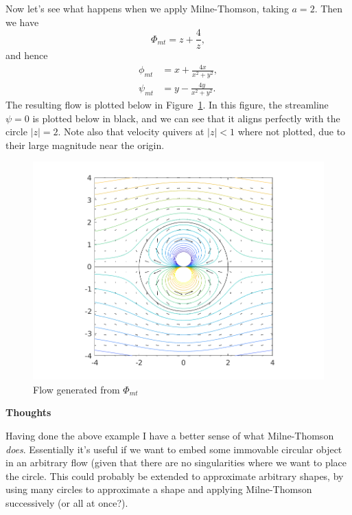 \documentclass{article}
\begin{document}
Now let's see what happens when we apply Milne-Thomson, taking $a = 2$. Then we have
%
\begin{equation*}
    \Phi_{mt} = z + \frac{4}{z}
    ,
\end{equation*}
%
and hence
%
\begin{align*}
    \phi_{mt} &= x + \frac{4 x}{x^2 + y^2}, \\
    \psi_{mt} &= y - \frac{4 y}{x^2 + y^2}
    .
\end{align*}
%
The resulting flow is plotted below in Figure~\ref{fig:mt-2}. In this
figure, the streamline $\psi = 0$ is plotted below in black, and we can
see that it aligns perfectly with the circle $|z| = 2$. Note also that
velocity quivers at $|z| < 1$ where not plotted, due to their large
magnitude near the origin.
%
\begin{figure}[!ht]
    \includegraphics[width=35em]{as09fig3}
    \centering
    \caption{Flow generated from $\Phi_{mt}$}
    \label{fig:mt-2}
\end{figure}

\textbf{Thoughts}

Having done the above example I have a better sense of what
Milne-Thomson \textit{does}. Essentially it's useful if we want to embed
some immovable circular object in an arbitrary flow (given that there
are no singularities where we want to place the circle. This could
probably be extended to approximate arbitrary shapes, by using many
circles to approximate a shape and applying Milne-Thomson successively
(or all at once?).
\end{document}
